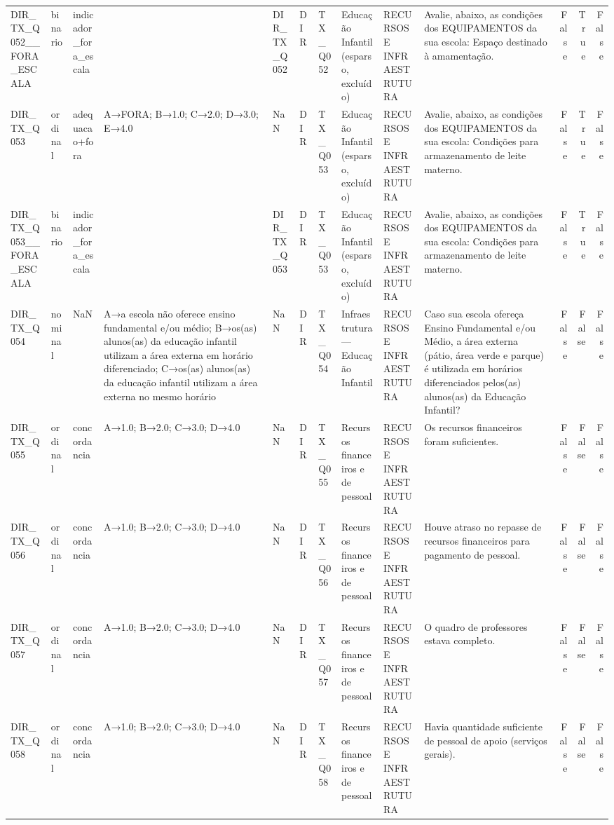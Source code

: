 \begin{tabular}{llllllllllrrr}
DIR\_TX\_Q052\_\_FORA\_ESCALA & binario & indicador\_fora\_escala &  & DIR\_TX\_Q052 & DIR & TX\_Q052 & Educação Infantil (esparso, excluído) & RECURSOS E INFRAESTRUTURA & Avalie, abaixo, as condições dos EQUIPAMENTOS da sua escola: Espaço destinado à amamentação. & False & True & False \\
DIR\_TX\_Q053 & ordinal & adequacao+fora & A→FORA; B→1.0; C→2.0; D→3.0; E→4.0 & NaN & DIR & TX\_Q053 & Educação Infantil (esparso, excluído) & RECURSOS E INFRAESTRUTURA & Avalie, abaixo, as condições dos EQUIPAMENTOS da sua escola: Condições para armazenamento de leite materno. & False & True & False \\
DIR\_TX\_Q053\_\_FORA\_ESCALA & binario & indicador\_fora\_escala &  & DIR\_TX\_Q053 & DIR & TX\_Q053 & Educação Infantil (esparso, excluído) & RECURSOS E INFRAESTRUTURA & Avalie, abaixo, as condições dos EQUIPAMENTOS da sua escola: Condições para armazenamento de leite materno. & False & True & False \\
DIR\_TX\_Q054 & nominal & NaN & A→a escola não oferece ensino fundamental e/ou médio; B→os(as) alunos(as) da educação infantil utilizam a área externa em horário diferenciado; C→os(as) alunos(as) da educação infantil utilizam a área externa no mesmo horário & NaN & DIR & TX\_Q054 & Infraestrutura — Educação Infantil & RECURSOS E INFRAESTRUTURA & Caso sua escola ofereça Ensino Fundamental e/ou Médio, a área externa (pátio, área verde e parque) é utilizada em horários diferenciados pelos(as) alunos(as) da Educação Infantil? & False & False & False \\
DIR\_TX\_Q055 & ordinal & concordancia & A→1.0; B→2.0; C→3.0; D→4.0 & NaN & DIR & TX\_Q055 & Recursos financeiros e de pessoal & RECURSOS E INFRAESTRUTURA & Os recursos financeiros foram suficientes. & False & False & False \\
DIR\_TX\_Q056 & ordinal & concordancia & A→1.0; B→2.0; C→3.0; D→4.0 & NaN & DIR & TX\_Q056 & Recursos financeiros e de pessoal & RECURSOS E INFRAESTRUTURA & Houve atraso no repasse de recursos financeiros para pagamento de pessoal. & False & False & False \\
DIR\_TX\_Q057 & ordinal & concordancia & A→1.0; B→2.0; C→3.0; D→4.0 & NaN & DIR & TX\_Q057 & Recursos financeiros e de pessoal & RECURSOS E INFRAESTRUTURA & O quadro de professores estava completo. & False & False & False \\
DIR\_TX\_Q058 & ordinal & concordancia & A→1.0; B→2.0; C→3.0; D→4.0 & NaN & DIR & TX\_Q058 & Recursos financeiros e de pessoal & RECURSOS E INFRAESTRUTURA & Havia quantidade suficiente de pessoal de apoio (serviços gerais). & False & False & False \\

\end{tabular}
